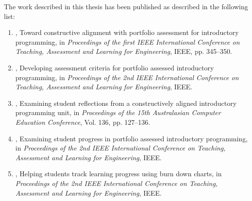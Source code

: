 The work described in this thesis has been published as described in the following list:
\begin{enumerate}
	\item \citet{Cain:2012a}, Toward constructive alignment with portfolio assessment for introductory programming, in \emph{Proceedings of the first IEEE International Conference on Teaching, Assessment and Learning for Engineering}, IEEE, pp. 345–350.

	\item \citet{Cain:2013c}, Developing assessment criteria for portfolio assessed introductory programming, in \emph{Proceedings of the 2nd IEEE International Conference on Teaching, Assessment and Learning for Engineering}, IEEE.

	\item \citet{Cain:2013a}, Examining student reflections from a constructively aligned introductory programming unit, in \emph{Proceedings of the 15th Australasian Computer Education Conference}, Vol. 136, pp. 127–136.

	\item \citet{Cain:2013b}, Examining student progress in portfolio assessed introductory programming, in \emph{Proceedings of the 2nd IEEE International Conference on Teaching, Assessment and Learning for Engineering}, IEEE.

	\item \citet{Woodward:2013}, Helping students track learning progress using burn down charts, in \emph{Proceedings of the 2nd IEEE International Conference on Teaching, Assessment and Learning for Engineering}, IEEE.

\end{enumerate}



